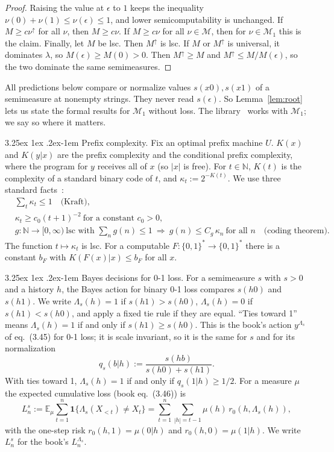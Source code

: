 \documentclass[11pt]{article}
\makeatletter
\renewcommand\paragraph{\@startsection{paragraph}{4}{\z@}%
  {3.25ex \@plus1ex \@minus.2ex}{-1em}%
  {\normalfont\normalsize\bfseries\boldmath}}
\newcommand{\Bs}{\{0,1\}^*}
\newcommand{\eps}{\epsilon}
\newcommand{\E}{\mathbb{E}}
\newcommand{\N}{\mathbb{N}}
\newcommand{\cM}{\mathcal{M}}
\newcommand{\cMone}{\mathcal{M}_1}
\newcommand{\ind}{\mathbf{1}}
\theoremstyle{definition}
\theoremstyle{remark}
\makeatother
\begin{document}
\begin{proof}
Raising the value at $\eps$ to $1$ keeps the inequality
$\nu(0)+\nu(1)\le\nu(\eps)\le1$, and lower semicomputability is unchanged.
If $M\ge c\nu^\uparrow$ for all $\nu$, then $M\ge c\nu$. If $M\ge c\nu$ for all
$\nu\in\cM$, then for $\nu\in\cMone$ this is the claim. Finally, let $M$ be
lsc. Then $M^\uparrow$ is lsc. If $M$ or $M^\uparrow$ is universal, it
dominates $\lambda$, so $M(\eps)\ge M(0)>0$. Then $M^\uparrow\ge M$ and
$M^\uparrow\le M/M(\eps)$, so the two dominate the same semimeasures.
\end{proof}

All predictions below compare or normalize values $s(x0),s(x1)$ of a
semimeasure at nonempty strings. They never read $s(\eps)$. So
Lemma~\ref{lem:root} lets us state the formal results for $\cMone$ without
loss. The library~\cite{milovanovlean} works with $\cMone$; we say so where it
matters.

\paragraph{Prefix complexity.}
Fix an optimal prefix machine $U$. $K(x)$ and $K(y|x)$ are the prefix
complexity and the conditional prefix complexity, where the program for $y$
receives all of $x$ (so $|x|$ is free). For $t\in\N$, $K(t)$ is the complexity
of a standard binary code of $t$, and $\kappa_t:=2^{-K(t)}$. We use three standard
facts~\cite{livitanyi}:
\begin{align}
&\textstyle\sum_{t}\kappa_t\le1 \quad\text{(Kraft)}, \label{eq:kraft}\\
&\kappa_t\ge c_0(t+1)^{-2}\ \text{for a constant } c_0>0, \label{eq:wlower}\\
&g:\N\to[0,\infty)\ \text{lsc with } \textstyle\sum_n g(n)\le1
\ \Longrightarrow\ g(n)\le C_g\,\kappa_n\ \text{for all } n \quad\text{(coding theorem)}. \label{eq:coding}
\end{align}
The function $t\mapsto \kappa_t$ is lsc. For a computable $F:\Bs\to\Bs$ there is
a constant $b_F$ with $K(F(x)|x)\le b_F$ for all $x$.

\paragraph{Bayes decisions for 0-1 loss.}
For a semimeasure $s$ with $s>0$ and a history $h$, the Bayes action for
binary 0-1 loss compares $s(h0)$ and $s(h1)$. We write $\Lambda_s(h)=1$ if
$s(h1)>s(h0)$, $\Lambda_s(h)=0$ if $s(h1)<s(h0)$, and apply a fixed tie rule
if they are equal. ``Ties toward 1'' means $\Lambda_s(h)=1$ if and only if
$s(h1)\ge s(h0)$. This is the book's action $y^{\Lambda_s}$ of eq.~(3.45) for
0-1 loss; it is scale invariant, so it is the same for $s$ and for its
normalization
\[
q_s(b|h):=\frac{s(hb)}{s(h0)+s(h1)} .
\]
With ties toward 1, $\Lambda_s(h)=1$ if and only if $q_s(1|h)\ge 1/2$.
For a measure $\mu$ the expected cumulative loss (book eq.~(3.46)) is
\[
L_n^{s}:=\E_\mu\sum_{t=1}^n \ind\{\Lambda_s(X_{<t})\neq X_t\}
=\sum_{t=1}^n\sum_{|h|=t-1}\mu(h)\,r_0(h,\Lambda_s(h)),
\]
with the one-step risk $r_0(h,1)=\mu(0|h)$ and $r_0(h,0)=\mu(1|h)$.
We write $L^s_n$ for the book's $L_n^{\Lambda_s}$.
\end{document}
